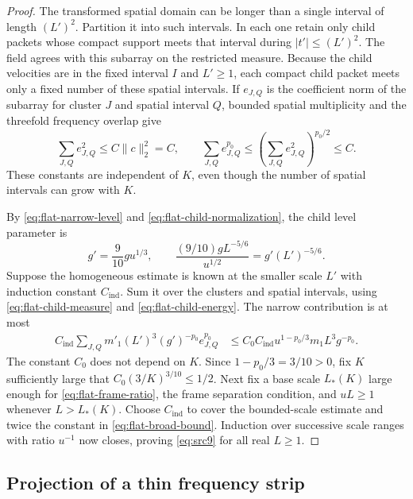 \begin{proof}
The transformed spatial domain can be longer than a single interval
of length $(L')^2$.  Partition it into such intervals.  In each one
retain only child packets whose compact support meets that interval
during $|t'|\leq(L')^2$.  The field agrees with this subarray on the
restricted measure.  Because the child velocities are in the fixed
interval $I$ and $L'\geq1$, each compact child packet meets only a
fixed number of these spatial intervals.  If $e_{J,Q}$ is the
coefficient norm of the subarray for cluster $J$ and spatial interval
$Q$, bounded spatial multiplicity and the threefold frequency
overlap give
\begin{equation}\label{eq:flat-child-energy}
 \sum_{J,Q}e_{J,Q}^2\leq C\|c\|_2^2=C,
 \qquad
 \sum_{J,Q}e_{J,Q}^{p_0}
     \leq\left(\sum_{J,Q}e_{J,Q}^2\right)^{p_0/2}\leq C.
\end{equation}
These constants are independent of $K$, even though the number of
spatial intervals can grow with $K$.

By \eqref{eq:flat-narrow-level} and
\eqref{eq:flat-child-normalization}, the child level parameter is
\[
 g'=\frac9{10}g u^{1/3},
 \qquad \frac{(9/10)gL^{-5/6}}{u^{1/2}}
                  =g'(L')^{-5/6}.
\]
Suppose the homogeneous estimate is known at the smaller scale $L'$
with induction constant $C_{\mathrm{ind}}$.  Sum it over the clusters
and spatial intervals, using \eqref{eq:flat-child-measure} and
\eqref{eq:flat-child-energy}.  The narrow contribution is at most
\begin{align}
 C_{\mathrm{ind}}\sum_{J,Q}
       m'_1(L')^3(g')^{-p_0}e_{J,Q}^{p_0}
 &\leq C_0 C_{\mathrm{ind}}
          u^{1-p_0/3}m_1L^3g^{-p_0}.
        \label{eq:flat-narrow-contraction}
\end{align}
The constant $C_0$ does not depend on $K$.  Since
$1-p_0/3=3/10>0$, fix $K$ sufficiently large that
$C_0(3/K)^{3/10}\leq1/2$.  Next fix a base scale $L_*(K)$ large
enough for \eqref{eq:flat-frame-ratio}, the frame separation condition,
and $uL\geq1$ whenever $L>L_*(K)$.  Choose
$C_{\mathrm{ind}}$ to cover the bounded-scale estimate and twice the
constant in \eqref{eq:flat-broad-bound}.  Induction over successive
scale ranges with ratio $u^{-1}$ now closes, proving
\eqref{eq:src9} for all real $L\geq1$.
\end{proof}

\subsection{Projection of a thin frequency strip}

